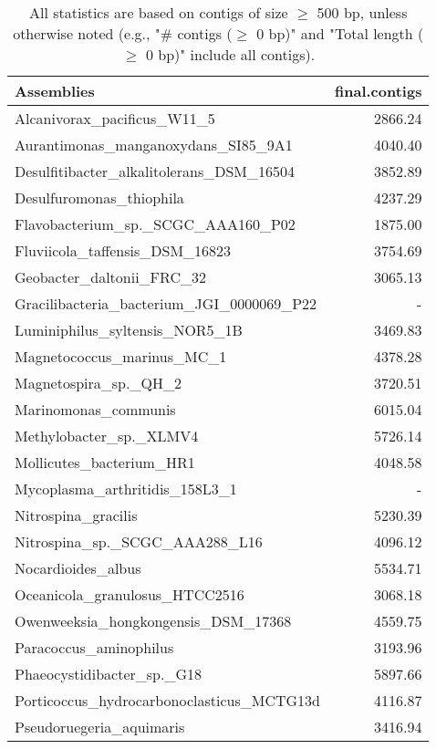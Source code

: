 \documentclass[12pt,a4paper]{article}
\begin{document}
\begin{table}[ht]
\begin{center}
\caption{All statistics are based on contigs of size $\geq$ 500 bp, unless otherwise noted (e.g., "\# contigs ($\geq$ 0 bp)" and "Total length ($\geq$ 0 bp)" include all contigs).}
\begin{tabular}{|l*{1}{|r}|}
\hline
Assemblies & final.contigs \\ \hline
Alcanivorax\_pacificus\_W11\_5 & 2866.24 \\ \hline
Aurantimonas\_manganoxydans\_SI85\_9A1 & 4040.40 \\ \hline
Desulfitibacter\_alkalitolerans\_DSM\_16504 & 3852.89 \\ \hline
Desulfuromonas\_thiophila & 4237.29 \\ \hline
Flavobacterium\_sp.\_SCGC\_AAA160\_P02 & 1875.00 \\ \hline
Fluviicola\_taffensis\_DSM\_16823 & 3754.69 \\ \hline
Geobacter\_daltonii\_FRC\_32 & 3065.13 \\ \hline
Gracilibacteria\_bacterium\_JGI\_0000069\_P22 & - \\ \hline
Luminiphilus\_syltensis\_NOR5\_1B & 3469.83 \\ \hline
Magnetococcus\_marinus\_MC\_1 & 4378.28 \\ \hline
Magnetospira\_sp.\_QH\_2 & 3720.51 \\ \hline
Marinomonas\_communis & 6015.04 \\ \hline
Methylobacter\_sp.\_XLMV4 & 5726.14 \\ \hline
Mollicutes\_bacterium\_HR1 & 4048.58 \\ \hline
Mycoplasma\_arthritidis\_158L3\_1 & - \\ \hline
Nitrospina\_gracilis & 5230.39 \\ \hline
Nitrospina\_sp.\_SCGC\_AAA288\_L16 & 4096.12 \\ \hline
Nocardioides\_albus & 5534.71 \\ \hline
Oceanicola\_granulosus\_HTCC2516 & 3068.18 \\ \hline
Owenweeksia\_hongkongensis\_DSM\_17368 & 4559.75 \\ \hline
Paracoccus\_aminophilus & 3193.96 \\ \hline
Phaeocystidibacter\_sp.\_G18 & 5897.66 \\ \hline
Porticoccus\_hydrocarbonoclasticus\_MCTG13d & 4116.87 \\ \hline
Pseudoruegeria\_aquimaris & 3416.94 \\ \hline

\end{tabular}
\end{center}
\end{table}
\end{document}
